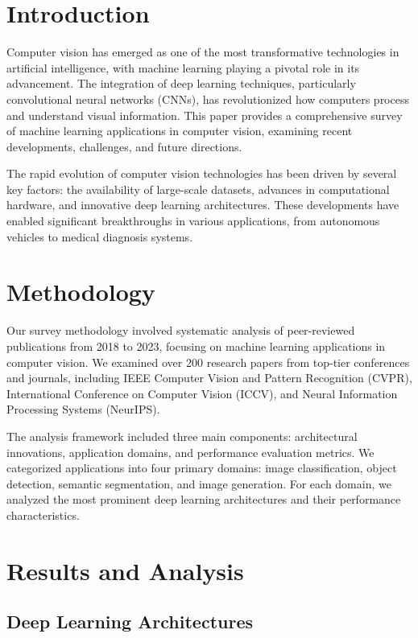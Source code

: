 \documentclass[conference, compsoc, twoside]{IEEEtran}
\begin{document}
\IEEEpeerreviewmaketitle
\thispagestyle{firststyle}

\section{Introduction}

Computer vision has emerged as one of the most transformative technologies in artificial intelligence, with machine learning playing a pivotal role in its advancement. The integration of deep learning techniques, particularly convolutional neural networks (CNNs), has revolutionized how computers process and understand visual information. This paper provides a comprehensive survey of machine learning applications in computer vision, examining recent developments, challenges, and future directions.

The rapid evolution of computer vision technologies has been driven by several key factors: the availability of large-scale datasets, advances in computational hardware, and innovative deep learning architectures. These developments have enabled significant breakthroughs in various applications, from autonomous vehicles to medical diagnosis systems.

\section{Methodology}

Our survey methodology involved systematic analysis of peer-reviewed publications from 2018 to 2023, focusing on machine learning applications in computer vision. We examined over 200 research papers from top-tier conferences and journals, including IEEE Computer Vision and Pattern Recognition (CVPR), International Conference on Computer Vision (ICCV), and Neural Information Processing Systems (NeurIPS).

The analysis framework included three main components: architectural innovations, application domains, and performance evaluation metrics. We categorized applications into four primary domains: image classification, object detection, semantic segmentation, and image generation. For each domain, we analyzed the most prominent deep learning architectures and their performance characteristics.

\section{Results and Analysis}

\subsection{Deep Learning Architectures}
\end{document}
